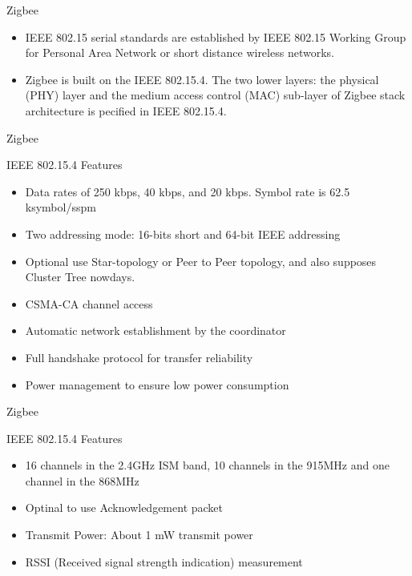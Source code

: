 \documentclass[serif,Blue]{beamer}
\begin{document}
\begin{frame}{Zigbee}
	\begin{itemize}\justifying{}
		\item
			IEEE 802.15 serial standards are established by IEEE 802.15 Working Group
			for Personal Area Network or short distance wireless networks.
		\item
			Zigbee is built on the IEEE 802.15.4. The two lower layers: the physical
			(PHY) layer and the medium access control (MAC) sub-layer of Zigbee stack
			architecture is pecified in IEEE 802.15.4.
	\end{itemize}
\end{frame}

\begin{frame}{Zigbee}
	\begin{block}{IEEE 802.15.4 Features}
		\begin{itemize}\justifying{}
			\item Data rates of 250 kbps, 40 kbps, and 20 kbps. Symbol rate is 62.5 ksymbol/sspm
			\item Two addressing mode: 16-bits short and 64-bit IEEE addressing
			\item Optional use Star-topology or Peer to Peer topology, and also supposes Cluster Tree nowdays.
			\item CSMA-CA channel access
			\item Automatic network establishment by the coordinator
			\item Full handshake protocol for transfer reliability
			\item Power management to ensure low power consumption
		\end{itemize}
	\end{block}
\end{frame}

\begin{frame}{Zigbee}
	\begin{block}{IEEE 802.15.4 Features}
		\begin{itemize}\justifying{}
			\item 16 channels in the 2.4GHz ISM band, 10 channels in the 915MHz and one channel in the 868MHz
			\item Optinal to use Acknowledgement packet
			\item Transmit Power: About 1 mW transmit power
			\item RSSI (Received signal strength indication) measurement
		\end{itemize}
	\end{block}
\end{frame}
\end{document}
